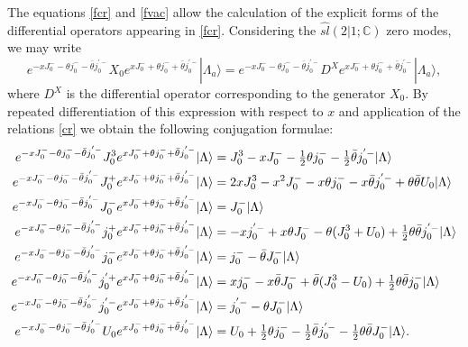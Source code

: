 \documentclass[a4paper,12pt]{article}
\def\thetabar    {\bar{\theta}}
\def\hslc        {\hat{sl}(2|1;{\mathbb C})}
\def\hf          {\tfrac{1}{2}}
\begin{document}
The equations \eqref{fcr} and \eqref{fvac} allow the calculation of
the explicit forms of the differential operators appearing in
\eqref{fcr}.  Considering the $\hslc$ zero modes, we may write
\begin{equation}
e^{-xJ_0^- - \theta j_0^- - \thetabar j_0^{'-}} X_0 e^{xJ_0^- + \theta j_0^- + \thetabar j_0^{'-}} |\Lambda_a \rangle = e^{-xJ_0^- - \theta j_0^- - \thetabar j_0^{'-}} D^X e^{xJ_0^- + \theta j_0^- + \thetabar j_0^{'-}}|\Lambda_a \rangle,
\end{equation}
where $D^X$ is the differential operator corresponding to the
generator $X_0$.  By repeated differentiation of this expression with
respect to $x$ and application of the relations \eqref{cr} we obtain
the following conjugation formulae:
\begin{align}
e^{-xJ_0^- - \theta j_0^- - \thetabar j_0^{'-}} J_0^3 e^{xJ_0^- +
\theta j_0^- + \thetabar j_0^{'-}}|\Lambda\rangle &= 
J_0^3 -xJ_0^- - \hf \theta j_0^- - \hf \thetabar j_0^{'-}|\Lambda\rangle\notag\\
e^{-xJ_0^- - \theta j_0^- - \thetabar j_0^{'-}} J_0^+ e^{xJ_0^- +
\theta j_0^- + \thetabar j_0^{'-}}|\Lambda\rangle &= 2x J_0^3 -x^2 J_0^- - x \theta
j_0^- - x \thetabar j_0^{'-} + \theta \thetabar U_0|\Lambda\rangle\notag\\
e^{-xJ_0^- - \theta j_0^- - \thetabar j_0^{'-}} J_0^- e^{xJ_0^- +
\theta j_0^- + \thetabar j_0^{'-}}|\Lambda\rangle &= J_0^-|\Lambda\rangle\notag\\
e^{-xJ_0^- - \theta j_0^- - \thetabar j_0^{'-}} j_0^+ e^{xJ_0^- +
\theta j_0^- + \thetabar j_0^{'-}}|\Lambda\rangle &= -xj_0^{'-} + x\theta J_0^- -
\theta (J_0^3 + U_0) + \hf \theta \thetabar j_0^{'-}|\Lambda\rangle\notag\\
e^{-xJ_0^- - \theta j_0^- - \thetabar j_0^{'-}} j_0^- e^{xJ_0^- +
\theta j_0^- + \thetabar j_0^{'-}}|\Lambda\rangle &= j_0^- - \thetabar J_0^-|\Lambda\rangle\notag\\
e^{-xJ_0^- - \theta j_0^- - \thetabar j_0^{'-}} j_0^{'+} e^{xJ_0^- +
\theta j_0^- + \thetabar j_0^{'-}}|\Lambda\rangle &= xj_0^- - x\thetabar J_0^- +
\thetabar (J_0^3 - U_0) + \hf \theta \thetabar j_0^-|\Lambda\rangle\notag\\
e^{-xJ_0^- - \theta j_0^- - \thetabar j_0^{'-}} j_0^{'-} e^{xJ_0^- +
\theta j_0^- + \thetabar j_0^{'-}}|\Lambda\rangle &= j_0^{'-} - \theta J_0^-|\Lambda\rangle\notag\\
e^{-xJ_0^- - \theta j_0^- - \thetabar j_0^{'-}} U_0 e^{xJ_0^- + \theta
j_0^- + \thetabar j_0^{'-}}|\Lambda\rangle &= U_0 + \hf \theta j_0^- - \hf \thetabar
j_0^{'-} - \hf \theta \thetabar J_0^-|\Lambda\rangle.
\end{align}
\end{document}
